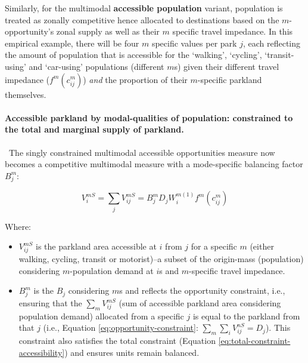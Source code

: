 \documentclass[
11pt, %
oneside, %
english, %
singlespacing, %
]{macthesis} %
\def\tightlist{}
\begin{document}
Similarly, for the multimodal \textbf{accessible population} variant, population is treated as zonally competitive hence allocated to destinations based on the \(m\)-opportunity's zonal supply as well as their \(m\) specific travel impedance. In this empirical example, there will be four \(m\) specific values per park \(j\), each reflecting the amount of population that is accessible for the `walking', `cycling', `transit-using' and `car-using' populations (different \(m\)s) given their different travel impedance (\(f^m(c^m_{ij})\)) \emph{and} the proportion of their \(m\)-specific parkland themselves.

\paragraph{Accessible parkland by modal-qualities of population: constrained to the total and marginal supply of parkland.}\label{accessible-parkland-by-modal-qualities-of-population-constrained-to-the-total-and-marginal-supply-of-parkland.}

~The singly constrained multimodal accessible opportunities measure now becomes a competitive multimodal measure with a mode-specific balancing factor \(B_j^{m}\):

\begin{equation}
\label{eq:singly-constrained-multimodal-accessibility-park}
V^{mS}_{i} = \sum_j V^{mS}_{ij} = B_j^{m} D_j W_i^{m(1)} f^m(c^m_{ij})
\end{equation} 

Where:

\begin{itemize}
\tightlist
\item
  \(V^{mS}_{ij}\) is the parkland area accessible at \(i\) from \(j\) for a specific \(m\) (either walking, cycling, transit or motorist)--a subset of the origin-mass (population) considering \(m\)-population demand at \(i\)s and \(m\)-specific travel impedance.
\item
  \(B_j^{m}\) is the \(B_j\) considering \(m\)s and reflects the opportunity constraint, i.e., ensuring that the \(\sum_m V^{mS}_{ij}\) (sum of accessible parkland area considering population demand) allocated from a specific \(j\) is equal to the parkland from that \(j\) (i.e., Equation \ref{eq:opportunity-constraint}: \(\sum_m \sum_i V^{nS}_{ij} =  D_j\)). This constraint also satisfies the total constraint (Equation \ref{eq:total-constraint-accessibility}) and ensures units remain balanced.
\end{itemize}
\end{document}
